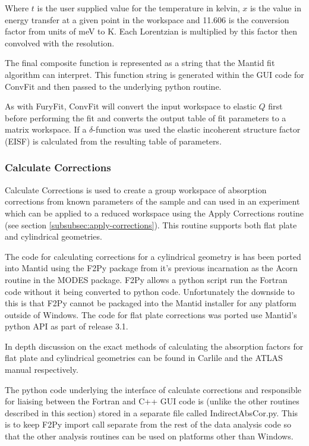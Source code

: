 \documentclass[paper=a4, fontsize=11pt]{scrartcl}	%
\numberwithin{equation}{section}															%
\numberwithin{figure}{section}																%
\numberwithin{table}{section}																%
\begin{document}
Where $t$ is the user supplied value for the temperature in kelvin, $x$ is the value in energy transfer at a given point in the workspace and 11.606 is the conversion factor from units of meV to K. Each Lorentzian is multiplied by this factor then convolved with the resolution.

The final composite function is represented as a string that the Mantid fit algorithm can interpret. This function string is generated within the GUI code for ConvFit and then passed to the underlying python routine.

As with FuryFit, ConvFit will convert the input workspace to elastic $Q$ first before performing the fit and converts the output table of fit parameters to a matrix workspace. If a $\delta$-function was used the elastic incoherent structure factor (EISF) is calculated from the resulting table of parameters.

\subsubsection{Calculate Corrections}
Calculate Corrections is used to create a group workspace of absorption corrections from known parameters of the sample and can used in an experiment which can be applied to a reduced workspace using the Apply Corrections routine (see section \ref{subsubsec:apply-corrections}). This routine supports both flat plate and cylindrical geometries.

The code for calculating corrections for a cylindrical geometry is has been ported into Mantid using the F2Py package from it's previous incarnation as the Acorn routine in the MODES package. F2Py allows a python script run the Fortran code without it being converted to python code. Unfortunately the downside to this is that F2Py cannot be packaged into the Mantid installer for any platform outside of Windows. The code for flat plate corrections was ported use Mantid's python API as part of release 3.1.

In depth discussion on the exact methods of calculating the absorption factors for flat plate and cylindrical geometries can be found in Carlile \citep{ccarlile1974} and the ATLAS manual \citep{aksoper1989} respectively.

The python code underlying the interface of calculate corrections and responsible for liaising between the Fortran and C++ GUI code is (unlike the other routines described in this section) stored in a separate file called IndirectAbsCor.py. This is to keep F2Py import call separate from the rest of the data analysis code so that the other analysis routines  can be used on platforms other than Windows.
\end{document}
